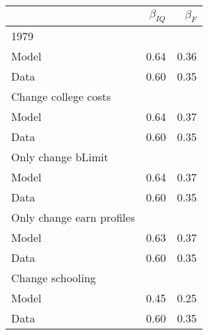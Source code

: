 \begin{tabular}{lrr}
\hline
  & $\beta_{IQ}$  & $\beta_{F}$  \\ 
\hline
1979 &   &   \\ 
Model & 0.64  & 0.36  \\ 
Data & 0.60  & 0.35  \\ 
Change college costs &   &   \\ 
Model & 0.64  & 0.37  \\ 
Data & 0.60  & 0.35  \\ 
Only change bLimit &   &   \\ 
Model & 0.64  & 0.37  \\ 
Data & 0.60  & 0.35  \\ 
Only change earn profiles &   &   \\ 
Model & 0.63  & 0.37  \\ 
Data & 0.60  & 0.35  \\ 
Change schooling &   &   \\ 
Model & 0.45  & 0.25  \\ 
Data & 0.60  & 0.35  \\ 
\hline
\end{tabular}%
